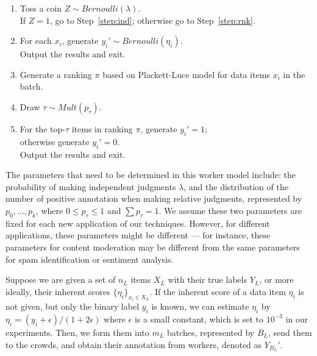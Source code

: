 \begin{enumerate}
  \item \label{step:tosscoin}
        Toss a coin $Z \sim Bernoulli(\lambda)$.  \\
        If $Z=1$, go to Step~\ref{step:ind};
        otherwise go to Step~\ref{step:rnk}.
  \item \label{step:ind}
        For each $x_i$, generate $y_i' \sim Bernoulli(\eta_i)$. \\
        Output the results and exit.
  \item \label{step:rnk}
        Generate a ranking $\pi$ based on Plackett-Luce model for data items $x_i$ in the batch.
  \item \label{step:draw}
        Draw $\tau \sim Mult(p_{\tau})$.
  \item \label{step:annotate}
        For the top-$\tau$ items in ranking $\pi$, generate $y_i' = 1$; \\
        otherwise generate $y_i' = 0$.  \\
        Output the results and exit.
\end{enumerate}



The parameters that need to be determined in this worker model include:
the probability of making independent judgments $\lambda$,
and the distribution of the number of positive annotation when making relative judgments,
represented by $p_0, \ldots, p_k$, where $0 \leq p_{\tau} \leq 1$ and $\sum p_{\tau} = 1$.
We assume these two parameters are fixed for each new application of our techniques.  
However, for different applications, these parameters might be different --- for instance, 
these parameters for content moderation may be different from the same parameters for spam identification or sentiment analysis.  




Suppose we are given a set of $n_L$ items $X_L$ with their true labels $Y_L$, 
or more ideally, their inherent scores $\{\eta_i\}_{x_i \in X_L}$.  
If the inherent score of a data item $\eta_i$ is not given, 
but only the binary label $y_i$ is known,
we can estimate $\eta_i$ by $\eta_i = (y_i + \epsilon)/(1 + 2 \epsilon)$ 
where $\epsilon$ is a small constant, which is set to $10^{-3}$ in our experiments.
Then, we form them into $m_L$ batches, represented by $B_L$, send them to the crowds,
and obtain their annotation from workers, denoted as $Y_{B_L}'$.



